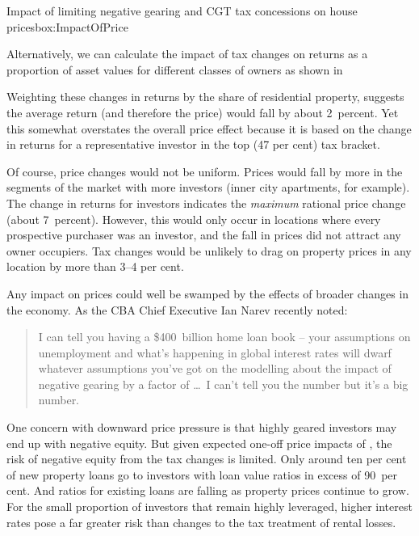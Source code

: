 \documentclass{grattan}\usepackage[]{graphicx}\usepackage[]{color}
\begin{document}
\begin{bigbox*}{Impact of limiting negative gearing {and CGT} tax concessions on house prices}{box:ImpactOfPrice}
\begin{table}[H]
{}
\vspace*{5.5pt}

\end{table}
Alternatively, we can calculate the impact of tax changes on returns as a proportion of asset values for different classes of owners as shown in

Weighting these changes in returns by the share of residential property, suggests the average return (and therefore the price) would fall by about 2~percent. Yet this somewhat overstates the overall price effect because it is based on the change in returns for a representative investor in the top (47 per cent) tax bracket.

Of course, price changes would not be uniform. Prices would fall by more in the segments of the market with more investors (inner city apartments, for example). The change in returns for investors indicates the \emph{maximum} rational price change (about 7~percent). However, this would only occur in locations where every prospective purchaser was an investor, and the fall in prices did not attract any owner occupiers. Tax changes would be unlikely to drag on property prices in any location by more than 3--4 per cent.

\end{bigbox*}

Any impact on prices could well be swamped by the effects of broader changes in the economy. As the CBA Chief Executive Ian Narev recently noted:

\begin{quote}
I can tell you having a \$400~billion home loan book -- your assumptions on unemployment and what's happening in global interest rates will dwarf whatever assumptions you've got on the modelling about the impact of negative gearing by a factor of \dots\ I can't tell you the number but it's a big number.
\end{quote}

One concern with downward price pressure is that highly geared investors may end up with negative equity. But given expected one-off price impacts of ,  the risk of negative equity from the tax changes is limited. Only around ten per cent of new property loans go to investors with loan value ratios in excess of 90~per cent.   And ratios for existing loans are falling as property prices continue to grow. For the small proportion of investors that remain highly leveraged, higher interest rates pose a far greater risk than changes to the tax treatment of rental losses.   
\end{document}
